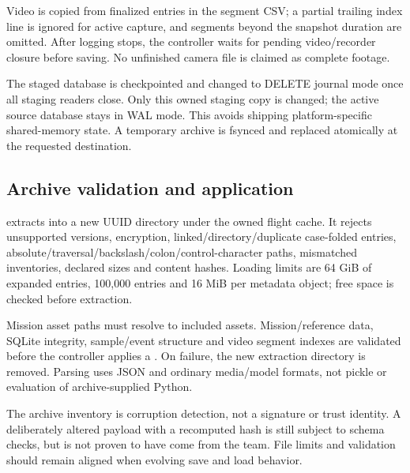 Video is copied from finalized entries in the segment CSV; a partial trailing
index line is ignored for active capture, and segments beyond the snapshot
duration are omitted. After logging stops, the controller waits for pending
video/recorder closure before saving. No unfinished camera file is claimed as
complete footage.

The staged database is checkpointed and changed to DELETE journal mode once all
staging readers close. Only this owned staging copy is changed; the active
source database stays in WAL mode. This avoids shipping platform-specific
shared-memory state. A temporary archive is fsynced and replaced atomically at
the requested destination.

\subsection{Archive validation and application}
 extracts into a new UUID directory under the owned flight
cache. It rejects unsupported versions, encryption, linked/directory/duplicate
case-folded entries, absolute/traversal/backslash/colon/control-character paths,
mismatched inventories, declared sizes and content hashes. Loading limits are
64 GiB of expanded entries, 100,000 entries and 16 MiB per metadata object; free
space is checked before extraction.

Mission asset paths must resolve to included assets. Mission/reference data,
SQLite integrity, sample/event structure and video segment indexes are validated
before the controller applies a . On failure, the new
extraction directory is removed. Parsing uses JSON and ordinary media/model
formats, not pickle or evaluation of archive-supplied Python.

The archive inventory is corruption detection, not a signature or trust identity.
A deliberately altered payload with a recomputed hash is still subject to
schema checks, but is not proven to have come from the team. File limits and
validation should remain aligned when evolving save and load behavior.

